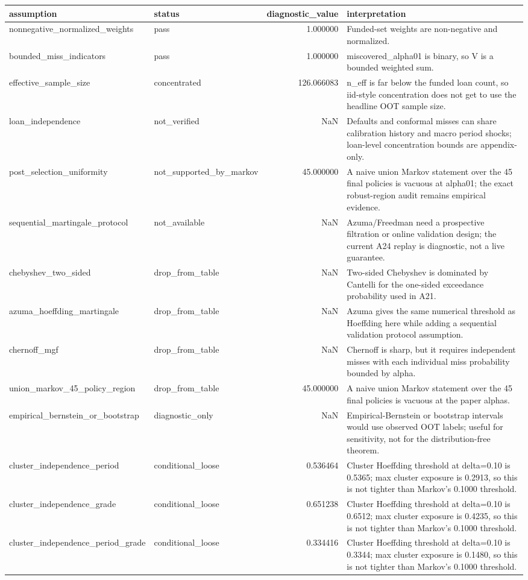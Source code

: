 \begin{tabular}{llrl}
\toprule
assumption & status & diagnostic\_value & interpretation \\
\midrule
nonnegative\_normalized\_weights & pass & 1.000000 & Funded-set weights are non-negative and normalized. \\
bounded\_miss\_indicators & pass & 1.000000 & miscovered\_alpha01 is binary, so V is a bounded weighted sum. \\
effective\_sample\_size & concentrated & 126.066083 & n\_eff is far below the funded loan count, so iid-style concentration does not get to use the headline OOT sample size. \\
loan\_independence & not\_verified & NaN & Defaults and conformal misses can share calibration history and macro period shocks; loan-level concentration bounds are appendix-only. \\
post\_selection\_uniformity & not\_supported\_by\_markov & 45.000000 & A naive union Markov statement over the 45 final policies is vacuous at alpha01; the exact robust-region audit remains empirical evidence. \\
sequential\_martingale\_protocol & not\_available & NaN & Azuma/Freedman need a prospective filtration or online validation design; the current A24 replay is diagnostic, not a live guarantee. \\
chebyshev\_two\_sided & drop\_from\_table & NaN & Two-sided Chebyshev is dominated by Cantelli for the one-sided exceedance probability used in A21. \\
azuma\_hoeffding\_martingale & drop\_from\_table & NaN & Azuma gives the same numerical threshold as Hoeffding here while adding a sequential validation protocol assumption. \\
chernoff\_mgf & drop\_from\_table & NaN & Chernoff is sharp, but it requires independent misses with each individual miss probability bounded by alpha. \\
union\_markov\_45\_policy\_region & drop\_from\_table & 45.000000 & A naive union Markov statement over the 45 final policies is vacuous at the paper alphas. \\
empirical\_bernstein\_or\_bootstrap & diagnostic\_only & NaN & Empirical-Bernstein or bootstrap intervals would use observed OOT labels; useful for sensitivity, not for the distribution-free theorem. \\
cluster\_independence\_period & conditional\_loose & 0.536464 & Cluster Hoeffding threshold at delta=0.10 is 0.5365; max cluster exposure is 0.2913, so this is not tighter than Markov's 0.1000 threshold. \\
cluster\_independence\_grade & conditional\_loose & 0.651238 & Cluster Hoeffding threshold at delta=0.10 is 0.6512; max cluster exposure is 0.4235, so this is not tighter than Markov's 0.1000 threshold. \\
cluster\_independence\_period\_grade & conditional\_loose & 0.334416 & Cluster Hoeffding threshold at delta=0.10 is 0.3344; max cluster exposure is 0.1480, so this is not tighter than Markov's 0.1000 threshold. \\
\bottomrule
\end{tabular}
